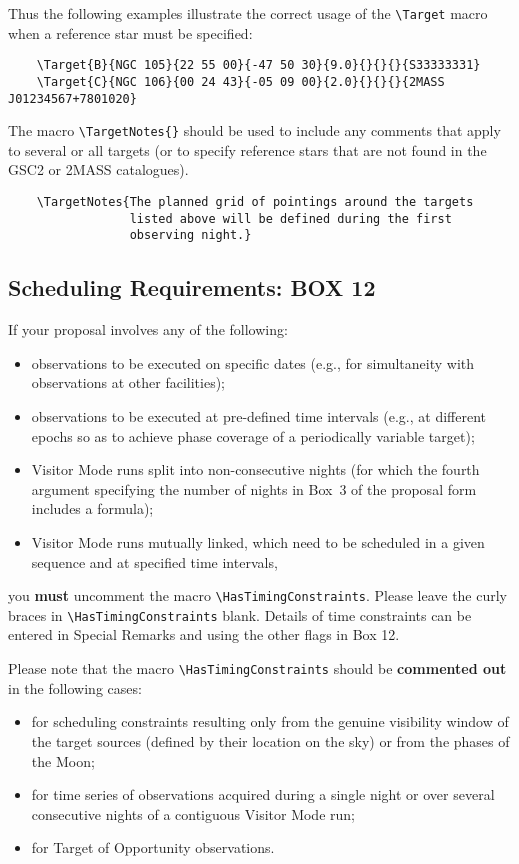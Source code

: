 \documentclass{article}
\begin{document}
Thus the following examples illustrate the correct usage of the
\verb|\Target| macro when a reference star must be specified:
\begin{verbatim}
    \Target{B}{NGC 105}{22 55 00}{-47 50 30}{9.0}{}{}{}{S33333331}
    \Target{C}{NGC 106}{00 24 43}{-05 09 00}{2.0}{}{}{}{2MASS J01234567+7801020}
\end{verbatim}

The macro \verb|\TargetNotes{}| should be used to include any
comments that apply to several or all targets (or to specify reference
stars that are not found in the GSC2 or 2MASS catalogues).
\begin{verbatim}
    \TargetNotes{The planned grid of pointings around the targets 
                 listed above will be defined during the first 
                 observing night.}
\end{verbatim}

\subsection{Scheduling Requirements: {\bf BOX 12}}
\label{sec:schedreq}
If your proposal involves any of the following:
\begin{itemize}
\item observations to be executed on specific dates (e.g., for
  simultaneity with observations at other facilities);
\item observations to be executed at pre-defined time intervals (e.g.,
  at different epochs so as to achieve phase coverage of a periodically
  variable target);
\item Visitor Mode runs split into non-consecutive nights (for which
  the fourth argument specifying the number of nights in Box~3 of the
  proposal form includes a formula);
\item Visitor Mode runs mutually linked, which need to be scheduled in
  a given sequence and at specified time intervals,
\end{itemize}
you {\bf must} uncomment the macro \verb|\HasTimingConstraints|.
Please leave the curly braces in \linebreak \verb|\HasTimingConstraints| blank.  Details of time
constraints can be entered in Special Remarks and using the other flags in Box 12.

Please note that the macro \verb|\HasTimingConstraints| should 
be {\bf commented out} in the following cases:
\begin{itemize}
\item for scheduling constraints resulting only from the genuine
  visibility window of the target sources (defined by their location
  on the sky) or from the phases of the Moon; 
\item for time series of observations acquired during a single night
  or over several consecutive nights of a contiguous Visitor Mode run; 
\item for Target of Opportunity observations.
\end{itemize} 
\end{document}
